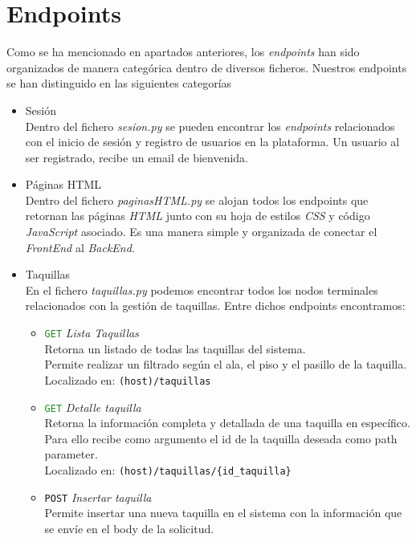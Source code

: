 \documentclass[12pt]{report}
\begin{document}
\section{Endpoints}
Como se ha mencionado en apartados anteriores, los \textit{endpoints} han sido organizados de manera categórica dentro de diversos ficheros. Nuestros endpoints se han distinguido en las siguientes categorías
\begin{itemize}
    \item Sesión\\
    Dentro del fichero \textit{sesion.py} se pueden encontrar los \textit{endpoints} relacionados con el inicio de sesión y registro de usuarios en la plataforma. Un usuario al ser registrado, recibe un email de bienvenida.
    \item Páginas HTML\\
    Dentro del fichero \textit{paginasHTML.py} se alojan todos los endpoints que retornan las páginas \textit{HTML} junto con su hoja de estilos \textit{CSS} y código \textit{JavaScript} asociado. Es una manera simple y organizada de conectar el \textit{FrontEnd} al \textit{BackEnd}.
    \item Taquillas\\
    En el fichero \textit{taquillas.py} podemos encontrar todos los nodos terminales relacionados con la gestión de taquillas.
    Entre dichos endpoints encontramos:
    \begin{itemize}
        \item \textcolor{ForestGreen}{\texttt{GET}} \textit{Lista Taquillas}\\
        Retorna un listado de todas las taquillas del sistema.\\
        Permite realizar un filtrado según el ala, el piso y el pasillo de la taquilla.
        Localizado en: \texttt{(host)/taquillas}
        \item \textcolor{ForestGreen}{\texttt{GET}} \textit{Detalle taquilla}\\
        Retorna la información completa y detallada de una taquilla en específico.\\
        Para ello recibe como argumento el id de la taquilla deseada como path parameter.\\
        Localizado en: \texttt{(host)/taquillas/\{id\_taquilla\}}
        \item \textcolor{YellowOrange}{\texttt{POST}} \textit{Insertar taquilla}\\
        Permite insertar una nueva taquilla en el sistema con la información que se envíe en el body de la solicitud.

\end{itemize}
\end{itemize}
\end{document}
